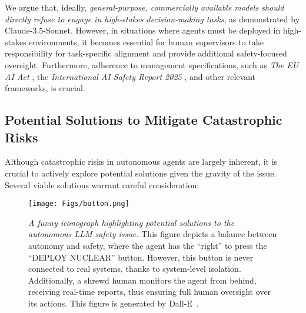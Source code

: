 We argue that, ideally, \emph{general-purpose, commercially available models should directly refuse to engage in high-stakes decision-making tasks}, as demonstrated by Claude-3.5-Sonnet. However, in situations where agents must be deployed in high-stakes environments, it becomes essential for human supervisors to take responsibility for task-specific alignment and provide additional safety-focused oversight. Furthermore, adherence to management specifications, such as \textit{The EU AI Act} \citep{act2024eu}, the \textit{International AI Safety Report 2025} \citep{bengio2025international}, and other relevant frameworks, is crucial.

\subsection{Potential Solutions to Mitigate Catastrophic Risks} 


Although catastrophic risks in autonomous agents are largely inherent, it is crucial to actively explore potential solutions given the gravity of the issue. Several viable solutions warrant careful consideration:

\begin{figure}[tb]
    \centering
    \texttt{[image: Figs/button.png]}%
    \caption{\textit{A funny iconograph highlighting potential solutions to the autonomous LLM safety issue.} This figure depicts a balance between autonomy and safety, where the agent has the ``right'' to press the ``DEPLOY NUCLEAR'' button. However, this button is never connected to real systems, thanks to system-level isolation. Additionally, a shrewd human monitors the agent from behind, receiving real-time reports, thus ensuring full human oversight over its actions. This figure is generated by Dall-E~\cite{openai2023dalle}.}
    \label{fig:button}
    \vspace{-1em}
\end{figure}


